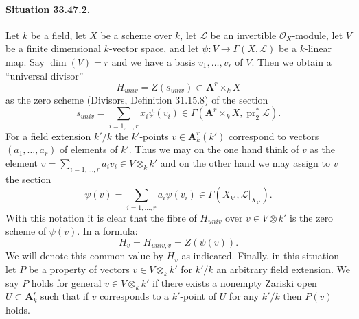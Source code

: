 
\paragraph{Situation 33.47.2.}
Let $k$ be a field, let $X$ be a scheme over $k$, let $\mathcal L$ be an invertible $\mathcal O_X$-module, let $V$ be a finite dimensional $k$-vector space, and let $\psi:V\to\Gamma(X,\mathcal L)$ be a $k$-linear map. Say $\dim(V)=r$ and we have a basis $v_1,\ldots,v_r$ of $V$. Then we obtain a ``universal divisor''
\[H_{univ}=Z(s_{univ})\subset\mathbf A^r\times_k X\]
as the zero scheme (Divisors, Definition 31.15.8) of the section
\[s_{univ}=\sum_{i=1,\ldots,r}x_i\psi(v_i)\in\Gamma(\mathbf A^r\times_k X,\operatorname{pr}_2^*\mathcal L).\]
For a field extension $k'/k$ the $k'$-points $v\in\mathbf A^r_k(k')$ correspond to vectors $(a_1,\ldots,a_r)$ of elements of $k'$. Thus we may on the one hand think of $v$ as the element $v=\sum_{i=1,\ldots,r}a_iv_i\in V\otimes_k k'$ and on the other hand we may assign to $v$ the section
\[\psi(v)=\sum_{i=1,\ldots,r}a_i\psi(v_i)\in\Gamma(X_{k'},\mathcal L|_{X_{k'}}).\]
With this notation it is clear that the fibre of $H_{univ}$ over $v\in V\otimes k'$ is the zero scheme of $\psi(v)$. In a formula:
\[H_v=H_{univ,v}=Z(\psi(v)).\]
We will denote this common value by $H_v$ as indicated. Finally, in this situation let $P$ be a property of vectors $v\in V\otimes_k k'$ for $k'/k$ an arbitrary field extension. We say $P$ holds for general $v\in V\otimes_k k'$ if there exists a nonempty Zariski open $U\subset\mathbf A^r_k$ such that if $v$ corresponds to a $k'$-point of $U$ for any $k'/k$ then $P(v)$ holds.

